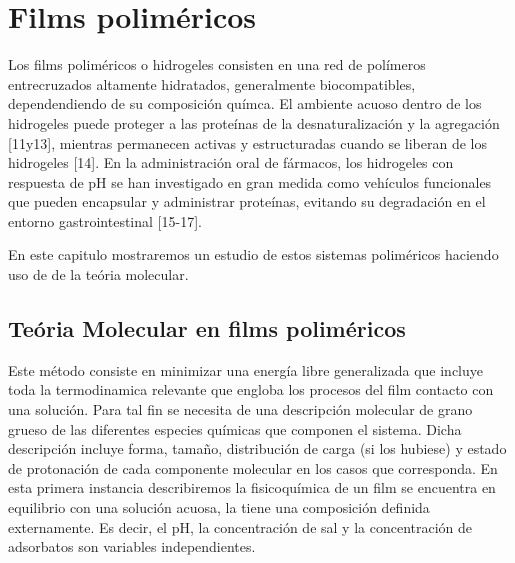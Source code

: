 
\chapter{Films polim\'ericos} %

\label{Chapter-film} %



Los films polim\'ericos o hidrogeles  consisten en una red de pol\'imeros entrecruzados altamente hidratados, generalmente biocompatibles, dependendiendo de su composici\'on qu\'imca. El ambiente acuoso dentro de los hidrogeles puede proteger a las prote\'inas de la desnaturalización y la agregaci\'on [11y13], mientras permanecen activas y estructuradas cuando se liberan de los hidrogeles [14]. En la administraci\'on oral de f\'armacos, los hidrogeles con respuesta de pH se han investigado en gran medida como veh\'iculos funcionales que pueden encapsular y administrar prote\'inas, evitando su degradaci\'on en el entorno gastrointestinal [15-17].


En este capitulo mostraremos un estudio  de estos sistemas polim\'ericos haciendo uso de de la te\'oria molecular.



\section{Te\'oria Molecular en films polim\'ericos} \label{sec:film-teoria}


Este m\'etodo consiste en minimizar una energ\'ia libre generalizada que incluye toda la termodinamica relevante que engloba los procesos del film contacto con una soluci\'on.
Para tal fin se necesita de una descripci\'on molecular de grano grueso de las diferentes especies qu\'imicas que componen el sistema.
Dicha descripci\'on incluye forma, tama\~no, distribuci\'on de carga (si los hubiese) y estado de protonaci\'on de cada componente molecular en los casos que corresponda.
En esta primera instancia describiremos la fisicoqu\'imica de un film  se encuentra en  equilibrio con una solución acuosa, la tiene una composición  definida externamente.
Es decir, el pH, la concentración de sal y la concentraci\'on de adsorbatos son variables independientes.

